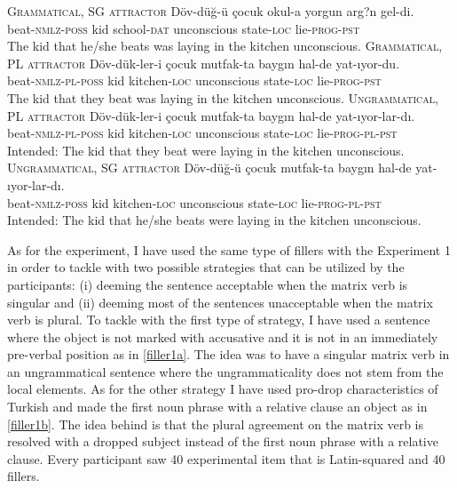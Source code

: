 \documentclass[doc]{apa6}
\begin{document}
\begin{exe}
\ex \label{prereg1}
  \begin{xlist}
  \ex \textsc{Grammatical, SG attractor} \label{reg1}
      \gll Döv-düğ-ü çocuk okul-a yorgun arg?n gel-di.\\
  beat-\textsc{nmlz}-\textsc{poss} kid school-\textsc{dat} unconscious state-\textsc{loc} lie-\textsc{prog}-\textsc{pst}\\ 
      \glt The kid that he/she beats was laying in the kitchen unconscious.
  \ex \textsc{Grammatical, PL attractor} \label{reg2}
      \gll Döv-dük-ler-i çocuk mutfak-ta baygın hal-de yat-ıyor-du.\\
  beat-\textsc{nmlz}-\textsc{pl}-\textsc{poss} kid kitchen-\textsc{loc} unconscious state-\textsc{loc} lie-\textsc{prog}-\textsc{pst}\\
      \glt The kid that they beat was laying in the kitchen unconscious.
  \ex \textsc{Ungrammatical, PL attractor} \label{reg3}
      \gll Döv-dük-ler-i çocuk mutfak-ta baygın hal-de yat-ıyor-lar-dı.\\
  beat-\textsc{nmlz}-\textsc{pl}-\textsc{poss} kid kitchen-\textsc{loc} unconscious state-\textsc{loc} lie-\textsc{prog}-\textsc{pl}-\textsc{pst}\\
      \glt Intended: The kid that they beat were laying in the kitchen unconscious.
  \ex \textsc{Ungrammatical, SG attractor} \label{reg4}
      \gll Döv-düğ-ü çocuk mutfak-ta baygın hal-de yat-ıyor-lar-dı.\\
  beat-\textsc{nmlz}-\textsc{poss} kid kitchen-\textsc{loc} unconscious state-\textsc{loc} lie-\textsc{prog}-\textsc{pl}-\textsc{pst}\\
      \glt Intended: The kid that he/she beats were laying in the kitchen unconscious.
  \end{xlist}
\end{exe}

As for the experiment, I have used the same type of fillers with the Experiment 1 in order to tackle with two possible strategies that can be utilized by the participants: (i) deeming the sentence acceptable when the matrix verb is singular and (ii) deeming most of the sentences unacceptable when the matrix verb is plural. To tackle with the first type of strategy, I have used a sentence where the object is not marked with accusative and it is not in an immediately pre-verbal position as in \autoref{filler1a}. The idea was to have a singular matrix verb in an ungrammatical sentence where the ungrammaticality does not stem from the local elements. As for the other strategy I have used pro-drop characteristics of Turkish and made the first noun phrase with a relative clause an object as in \autoref{filler1b}. The idea behind is that the plural agreement on the matrix verb is resolved with a dropped subject instead of the first noun phrase with a relative clause. Every participant saw 40 experimental item that is Latin-squared and 40 fillers.
\end{document}
